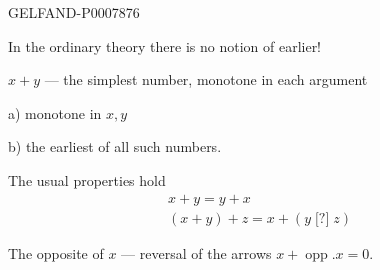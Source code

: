 \begin{GelfandAdjacentEvidence}{GELFAND-P000787}{6}


In the ordinary theory there is no notion of earlier!

\(x+y\) --- the simplest number, monotone in each argument

a) monotone in \(x,y\)

b) the earliest of all such numbers.

The usual properties hold
\begin{gather*}
x+y=y+x\\
(x+y)+z=x+(y\mathbin{\text{[?]}}z)
\end{gather*}
\end{GelfandAdjacentEvidence}



The opposite of \(x\) --- reversal of the arrows\qquad
\(x+\operatorname{opp}.x=0\).


